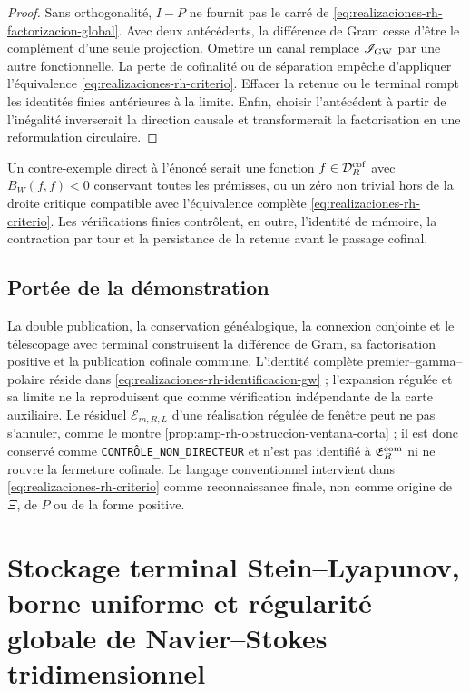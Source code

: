 \begin{proof}
Sans orthogonalité, \(I-P\) ne fournit pas le carré de
\eqref{eq:realizaciones-rh-factorizacion-global}. Avec deux antécédents, la
différence de Gram cesse d'être le complément d'une seule projection. Omettre
un canal remplace \(\mathscr I_{\rm GW}\) par une autre fonctionnelle. La perte de
cofinalité ou de séparation empêche d'appliquer l'équivalence
\eqref{eq:realizaciones-rh-criterio}. Effacer la retenue ou le terminal rompt les
identités finies antérieures à la limite. Enfin, choisir l'antécédent
à partir de l'inégalité inverserait la direction causale et transformerait la
factorisation en une reformulation circulaire.
\end{proof}

Un contre-exemple direct à l'énoncé serait une fonction
\(f\in\mathcal D_R^{\rm cof}\) avec \(B_W(f,f)<0\) conservant toutes les
prémisses, ou un zéro non trivial hors de la droite critique compatible avec
l'équivalence complète \eqref{eq:realizaciones-rh-criterio}. Les
vérifications finies contrôlent, en outre, l'identité de mémoire, la contraction par tour
et la persistance de la retenue avant le passage cofinal.

\section*{Portée de la démonstration}

La double publication, la conservation généalogique, la connexion conjointe et le
télescopage avec terminal construisent la différence de Gram, sa factorisation
positive et la publication cofinale commune. L'identité complète
premier--gamma--polaire réside dans
\eqref{eq:realizaciones-rh-identificacion-gw} ; l'expansion régulée et sa
limite ne la reproduisent que comme vérification indépendante de la carte
auxiliaire.
Le résiduel \(\mathcal E_{m,R,L}\) d'une réalisation régulée de fenêtre
peut ne pas s'annuler, comme le montre
\cref{prop:amp-rh-obstruccion-ventana-corta} ; il est donc conservé comme
\texttt{CONTRÔLE\_NON\_DIRECTEUR} et n'est pas identifié à
\(\mathfrak E_R^{\rm com}\) ni ne rouvre la fermeture cofinale. Le langage
conventionnel intervient dans \eqref{eq:realizaciones-rh-criterio} comme
reconnaissance finale, non comme origine de \(\Xi\), de \(P\) ou de la forme
positive.

\chapter{Stockage terminal Stein--Lyapunov, borne uniforme et régularité
globale de Navier--Stokes tridimensionnel}

